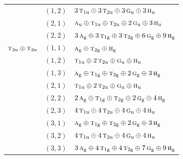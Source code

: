\documentclass[11pt]{article}
\newcommand{\irr}[1]{\text{\normalfont\scshape #1}}
\newcommand{\ptag}[1]{\mathrm{#1}}
\begin{document}
\begin{longtable}{p{} c p{}}
 & $(1,2)$ & $3\,\irr{t}_{1\ptag{u}}\oplus 3\,\irr{t}_{2\ptag{u}}\oplus 3\,\irr{g}_{\ptag{u}}\oplus 3\,\irr{h}_{\ptag{u}}$\\

 & $(2,1)$ & $\irr{a}_{\ptag{u}}\oplus \irr{t}_{1\ptag{u}}\oplus \irr{t}_{2\ptag{u}}\oplus 2\,\irr{g}_{\ptag{u}}\oplus 3\,\irr{h}_{\ptag{u}}$\\

 & $(2,2)$ & $3\,\irr{a}_{\ptag{g}}\oplus 3\,\irr{t}_{1\ptag{g}}\oplus 3\,\irr{t}_{2\ptag{g}}\oplus 6\,\irr{g}_{\ptag{g}}\oplus 9\,\irr{h}_{\ptag{g}}$\\

\hline

$\irr{t}_{2\ptag{u}}\otimes \irr{t}_{2\ptag{u}}$ & $(1,1)$ & $\irr{a}_{\ptag{g}}\oplus \irr{t}_{2\ptag{g}}\oplus \irr{h}_{\ptag{g}}$\\

 & $(1,2)$ & $\irr{t}_{1\ptag{u}}\oplus 2\,\irr{t}_{2\ptag{u}}\oplus \irr{g}_{\ptag{u}}\oplus \irr{h}_{\ptag{u}}$\\

 & $(1,3)$ & $\irr{a}_{\ptag{g}}\oplus \irr{t}_{1\ptag{g}}\oplus \irr{t}_{2\ptag{g}}\oplus 2\,\irr{g}_{\ptag{g}}\oplus 3\,\irr{h}_{\ptag{g}}$\\

 & $(2,1)$ & $\irr{t}_{1\ptag{u}}\oplus 2\,\irr{t}_{2\ptag{u}}\oplus \irr{g}_{\ptag{u}}\oplus \irr{h}_{\ptag{u}}$\\

 & $(2,2)$ & $2\,\irr{a}_{\ptag{g}}\oplus \irr{t}_{1\ptag{g}}\oplus \irr{t}_{2\ptag{g}}\oplus 2\,\irr{g}_{\ptag{g}}\oplus 4\,\irr{h}_{\ptag{g}}$\\

 & $(2,3)$ & $4\,\irr{t}_{1\ptag{u}}\oplus 4\,\irr{t}_{2\ptag{u}}\oplus 4\,\irr{g}_{\ptag{u}}\oplus 4\,\irr{h}_{\ptag{u}}$\\

 & $(3,1)$ & $\irr{a}_{\ptag{g}}\oplus \irr{t}_{1\ptag{g}}\oplus \irr{t}_{2\ptag{g}}\oplus 2\,\irr{g}_{\ptag{g}}\oplus 3\,\irr{h}_{\ptag{g}}$\\

 & $(3,2)$ & $4\,\irr{t}_{1\ptag{u}}\oplus 4\,\irr{t}_{2\ptag{u}}\oplus 4\,\irr{g}_{\ptag{u}}\oplus 4\,\irr{h}_{\ptag{u}}$\\

 & $(3,3)$ & $3\,\irr{a}_{\ptag{g}}\oplus 4\,\irr{t}_{1\ptag{g}}\oplus 4\,\irr{t}_{2\ptag{g}}\oplus 7\,\irr{g}_{\ptag{g}}\oplus 9\,\irr{h}_{\ptag{g}}$\\


\end{longtable}
\end{document}
